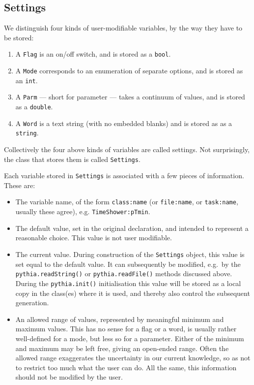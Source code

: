 \documentclass{elsartmod}
\begin{document}
\subsection{Settings}

We distinguish four kinds of user-modifiable variables, by the way
they have to be stored:
\begin{enumerate}
\item A \texttt{Flag} is an on/off switch, and is stored as a 
\texttt{bool}.
\item A \texttt{Mode} corresponds to an enumeration of 
separate options, and is stored as an \texttt{int}.
\item A \texttt{Parm} --- short for parameter --- takes a continuum 
of values, and is stored as a \texttt{double}.
\item A \texttt{Word} is a text string (with no embedded blanks)
and is stored as as a \texttt{string}. 
\end{enumerate}
Collectively the four above kinds of variables are called
settings. Not surprisingly, the class that stores them 
is called \texttt{Settings}. 

Each variable stored in \texttt{Settings} is associated 
with a few pieces of information. These are:
\begin{itemize}
\item 
The variable name, of the form \texttt{class:name} (or
\texttt{file:name}, or \texttt{task:name}, usually these agree), e.g.
\texttt{TimeShower:pTmin}.
\item  
The default value, set in the original declaration, and intended
to represent a reasonable choice. This value 
is not user modifiable. 
\item 
The current value. During construction of the \texttt{Settings}
object, this value is set equal to the default value. It can
subsequently be modified, e.g.\ by the
\texttt{pythia.readString()} or \texttt{pythia.readFile()} methods
discussed above. During the \texttt{pythia.init()} initialisation 
this value will be stored as a local copy in the class(es) where it 
is used, and thereby also control the subsequent generation. 
\item 
An allowed range of values, represented by meaningful minimum and 
maximum values. This has no sense for a flag or a word, is usually 
rather well-defined for a mode, but less so for a parameter. Either 
of the minimum and maximum may be left free, giving an open-ended 
range. Often the allowed range exaggerates the uncertainty in our 
current knowledge, so as not to restrict too much what the user can
do. All the same, this information should not be modified by the
user. 
\end{itemize}
\end{document}
